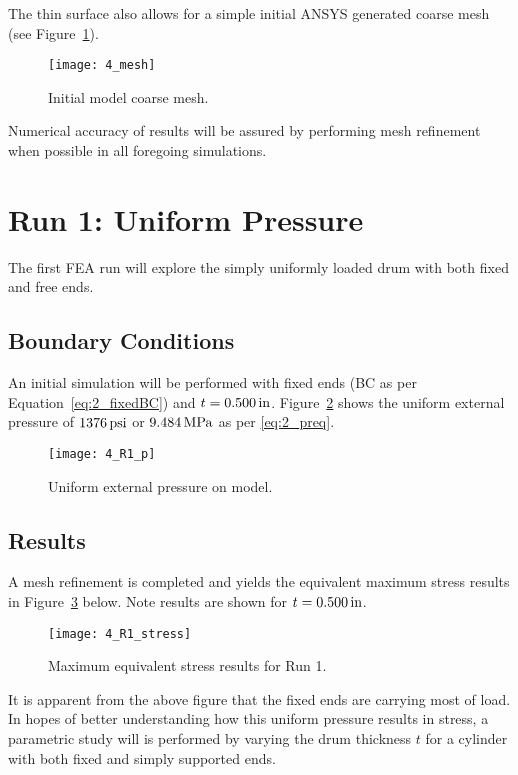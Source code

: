 The thin surface also allows for a simple initial ANSYS generated coarse mesh (see Figure~\ref{fig:4_mesh}).

\begin{figure}[H]
	\centering
	\texttt{[image: 4\_mesh]}
	\caption{Initial model coarse mesh.}
	\label{fig:4_mesh}
\end{figure}

Numerical accuracy of results will be assured by performing mesh refinement when possible in all foregoing simulations.

\section{Run 1: Uniform Pressure}
\label{section:4_R1}

The first FEA run will explore the simply uniformly loaded drum with both fixed and free ends. 

\subsection{Boundary Conditions}
\label{subsection:R1BC}

An initial simulation will be performed with fixed ends (BC as per Equation~\ref{eq:2_fixedBC}) and $t=0.500\,\mathrm{in}$. Figure~\ref{fig:4_R1_p} shows the uniform external pressure of $1376 \,\mathrm{psi}$ or $9.484 \,\mathrm{MPa}$ as per \ref{eq:2_preq}.
\begin{figure}[H]
	\centering
	\texttt{[image: 4\_R1\_p]}
	\caption{Uniform external pressure on model.}
	\label{fig:4_R1_p}
\end{figure}

\subsection{Results}

A mesh refinement is completed and yields the equivalent maximum stress results in Figure~\ref{fig:4_R1_stress} below. Note results are shown for $t=0.500\,\mathrm{in}$.

\begin{figure}[H]
	\centering
	\texttt{[image: 4\_R1\_stress]}
	\caption{Maximum equivalent stress results for Run 1.}
	\label{fig:4_R1_stress}
\end{figure}

It is apparent from the above figure that the fixed ends are carrying most of load. In hopes of better understanding how this uniform pressure results in stress, a parametric study will is performed by varying the drum thickness $t$ for a cylinder with both fixed and simply supported ends.


